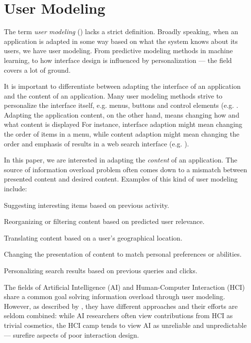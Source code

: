 \section{User Modeling}
\label{sec:modeling}

The term \emph{user modeling} () lacks a strict definition. 
Broadly speaking, when an application is adapted in some way based on what the system knows about its users, we have user modeling. 
From predictive modeling methods in machine learning, 
to how interface design is influenced by personalization --- the field covers a lot of ground. 

It is important to differentiate between adapting the interface of an application and the content of an application. 
Many user modeling methods strive to personalize the interface itself, e.g. menus, buttons and control elements 
(e.g. \cite{Jameson2009, Fischer2001}. 
Adapting the application content, on the other hand, means changing how and what content is displayed
For instance, interface adaption might mean changing the order of items in a menu, while content 
adaption might mean changing the order and emphasis of results in a web search interface
(e.g. \cite{Xu2008, Qiu2006, Rhodes2000}).

In this paper, we are interested in adapting the \emph{content} of an application.
The source of information overload problem often comes down to a mismatch between presented content and desired content. 
Examples of this kind of user modeling include:

\begin{itemize*}
  \item Suggesting interesting items based on previous activity.
  \item Reorganizing or filtering content based on predicted user relevance.
  \item Translating content based on a user's geographical location.
  \item Changing the presentation of content to match personal preferences or abilities.
  \item Personalizing search results based on previous queries and clicks.
\end{itemize*}

The fields of Artificial Intelligence (AI) and Human-Computer Interaction (HCI) share a common goal solving information overload through user modeling. 
However, as described by \cite[p6]{Lieberman2009}, they have different approaches and their efforts are seldom combined: 
while AI researchers often view contributions from HCI as trivial cosmetics, the HCI camp
tends to view AI as unreliable and unpredictable --- surefire aspects of poor interaction design.

